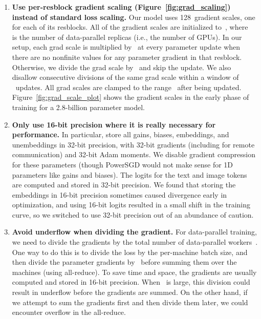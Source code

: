 \documentclass{article}
\begin{document}
\begin{enumerate}
    \item \textbf{Use per-resblock gradient scaling (Figure~\ref{fig:grad_scaling}) instead of standard loss scaling.} Our model uses 128~gradient scales, one for each of its resblocks. All of the gradient scales are initialized to~, where~ is the number of data-parallel replicas (i.e., the number of GPUs). In our setup, each grad scale is multiplied by~ at every parameter update when there are no nonfinite values for any parameter gradient in that resblock. Otherwise, we divide the grad scale by~ and skip the update. We also disallow consecutive divisions of the same grad scale within a window of ~updates. All grad scales are clamped to the range~ after being updated. Figure~\ref{fig:grad_scale_plot} shows the gradient scales in the early phase of training for a 2.8-billion parameter model.
    \item \textbf{Only use 16-bit precision where it is really necessary for performance.} In particular, store all gains, biases, embeddings, and unembeddings in 32-bit precision, with 32-bit gradients (including for remote communication) and 32-bit Adam moments. We disable gradient compression for these parameters (though PowerSGD would not make sense for 1D parameters like gains and biases). The logits for the text and image tokens are computed and stored in 32-bit precision. We found that storing the embeddings in 16-bit precision sometimes caused divergence early in optimization, and using 16-bit logits resulted in a small shift in the training curve, so we switched to use 32-bit precision out of an abundance of caution.
    \item \textbf{Avoid underflow when dividing the gradient.} For data-parallel training, we need to divide the gradients by the total number of data-parallel workers~. One way to do this is to divide the loss by the per-machine batch size, and then divide the parameter gradients by~ before summing them over the machines (using all-reduce). To save time and space, the gradients are usually computed and stored in 16-bit precision. When~ is large, this division could result in underflow before the gradients are summed. On the other hand, if we attempt to sum the gradients first and then divide them later, we could encounter overflow in the all-reduce.
    

\end{enumerate}
\end{document}
